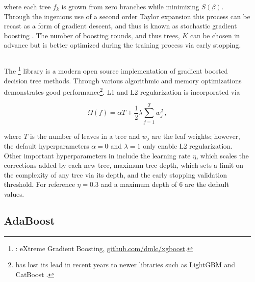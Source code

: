 \noindent where each tree $f_{k}$ is grown from zero branches while minimizing $S\left(\beta\right)$.
Through the ingenious use of a second order Taylor expansion this process can
be recast as a form of gradient descent, and thus is known as
stochastic gradient boosting \cite{10.2307/2699986,FRIEDMAN2002367}.
The number of boosting rounds, and thus trees, $K$ can be chosen in advance
but is better optimized during the training process via early stopping.

\subsection{\xgboost}%
\label{class:BDT:xgboost}

The \xgboost\footnote{\xgboost: eXtreme Gradient Boosting, \href{https://github.com/dmlc/xgboost}{github.com/dmlc/xgboost}.} library \cite{XGBoost}
is a modern open source implementation of gradient boosted decision tree methods.
Through various algorithmic and memory optimizations \xgboost demonstrates good performance\footnote{\xgboost has lost
its lead in recent years to newer libraries such as LightGBM \cite{LightGBM}
and CatBoost \cite{CatBoost}.}.
L1 and L2 regularization is incorporated via

\begin{equation} \label{eq:bdt_omega_reg}
\Omega\left(f\right) = \alpha T + \frac{1}{2}\lambda \sum_{j=1}^T w_j^2\,,
\end{equation}

\noindent where $T$ is the number of leaves in a tree and $w_{j}$ are the leaf weights;
however, the default hyperparameters $\alpha=0$ and $\lambda=1$ only enable L2 regularization.
Other important hyperparameters in \xgboost include the
learning rate $\eta$, which scales the corrections added by each new tree,
maximum tree depth, which sets a limit on the complexity of any tree via its depth,
and the early stopping validation threshold.
For reference $\eta=0.3$ and a maximum depth of 6 are the default values.

\subsection{AdaBoost}
\label{class:BDT:AdaBoost}


